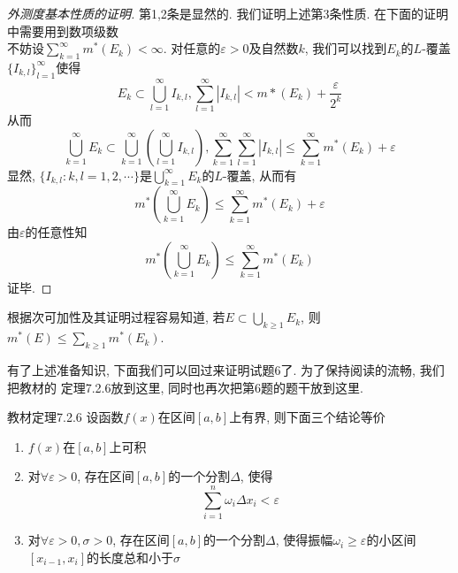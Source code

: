 \documentclass[a4paper,12pt]{article}
\begin{document}
\begin{proof}[外测度基本性质的证明]
  第1,2条是显然的. 我们证明上述第3条性质. 在下面的证明中需要用到数项级数 \\
  不妨设$\sum_{k=1}^{\infty}m^*(E_k)<\infty$. 对任意的$\varepsilon>0$及自然数$k$, 
  我们可以找到$E_k$的$L$-覆盖$\{I_{k,l}\}_{l=1}^{\infty}$使得
  \[E_k\subset\bigcup_{l=1}^{\infty}I_{k,l},\sum_{l=1}^{\infty}|I_{k,l}|<m*(E_k)+\frac{\varepsilon}{2^k}\]
  从而
  \[\bigcup_{k=1}^{\infty}E_k\subset\bigcup_{k=1}^{\infty}(\bigcup_{l=1}^{\infty}I_{k,l}),
  \sum_{k=1}^{\infty}\sum_{l=1}^{\infty}|I_{k,l}|\leq \sum_{k=1}^\infty m^*(E_k)+\varepsilon
  \]
  显然, $\{I_{k,l}:k,l=1,2,\cdots\}$是$\bigcup_{k=1}^\infty E_k$的$L$-覆盖, 从而有
  \[m^*(\bigcup_{k=1}^{\infty}E_k)\leq \sum_{k=1}^\infty m^*(E_k)+\varepsilon\]
  由$\varepsilon$的任意性知
  \[m^*(\bigcup_{k=1}^{\infty}E_k)\leq \sum_{k=1}^\infty m^*(E_k)\]
  证毕.
\end{proof}
根据次可加性及其证明过程容易知道, 若$E\subset \bigcup_{k\geq1} E_k$, 则$m^*(E)\leq \sum_{k\geq1}m^*(E_k)$.

有了上述准备知识, 下面我们可以回过来证明试题6了. 为了保持阅读的流畅, 我们把教材的
定理7.2.6放到这里, 同时也再次把第6题的题干放到这里.
\begin{theorem}{教材定理7.2.6}\label{thm:integrability}
  设函数$f(x)$在区间$[a,b]$上有界, 则下面三个结论等价
  \begin{enumerate}
    \item $f(x)$在$[a,b]$上可积
    \item 对$\forall \varepsilon>0$, 存在区间$[a,b]$的一个分割$\Delta$, 使得
      \[\sum_{i=1}^{n}\omega_i\Delta x_i<\varepsilon\]
    \item 对$\forall \varepsilon>0,\sigma>0$, 存在区间$[a,b]$的一个分割$\Delta$, 
  使得振幅$\omega_i\geq\varepsilon$的小区间$[x_{i-1},x_{i}]$的长度总和小于$\sigma$
  \end{enumerate}
\end{theorem}
\end{document}
